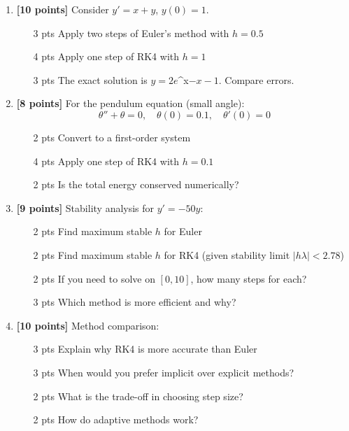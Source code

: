 \documentclass[12pt]{article}
\begin{document}
\begin{enumerate}[resume]
\item \textbf{[10 points]} Consider $y' = x + y$, $y(0) = 1$.
\begin{enumerate}[label=(\alph*)]
\item [3 pts] Apply two steps of Euler's method with $h = 0.5$
\item [4 pts] Apply one step of RK4 with $h = 1$
\item [3 pts] The exact solution is $y = 2e$^{x}$ - x - 1$. Compare errors.
\end{enumerate}

\item \textbf{[8 points]} For the pendulum equation (small angle):
$$\theta'' + \theta = 0, \quad \theta(0) = 0.1, \quad \theta'(0) = 0$$
\begin{enumerate}[label=(\alph*)]
\item [2 pts] Convert to a first-order system
\item [4 pts] Apply one step of RK4 with $h = 0.1$
\item [2 pts] Is the total energy conserved numerically?
\end{enumerate}

\item \textbf{[9 points]} Stability analysis for $y' = -50y$:
\begin{enumerate}[label=(\alph*)]
\item [2 pts] Find maximum stable $h$ for Euler
\item [2 pts] Find maximum stable $h$ for RK4 (given stability limit $|h\lambda| < 2.78$)
\item [2 pts] If you need to solve on $[0, 10]$, how many steps for each?
\item [3 pts] Which method is more efficient and why?
\end{enumerate}

\item \textbf{[10 points]} Method comparison:
\begin{enumerate}[label=(\alph*)]
\item [3 pts] Explain why RK4 is more accurate than Euler
\item [3 pts] When would you prefer implicit over explicit methods?
\item [2 pts] What is the trade-off in choosing step size?
\item [2 pts] How do adaptive methods work?
\end{enumerate}


\end{enumerate}
\end{document}
